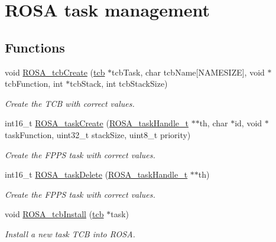 \hypertarget{group__rosa__kernel__module}{}\section{R\+O\+SA task management}
\label{group__rosa__kernel__module}
\subsection*{Functions}
\begin{DoxyCompactItemize}
\item 
void \mbox{\hyperlink{group__rosa__kernel__module_ga88a553c195e2f549835cbbf4e36a71ff}{R\+O\+S\+A\+\_\+tcb\+Create}} (\mbox{\hyperlink{structtcb__record__t}{tcb}} $\ast$tcb\+Task, char tcb\+Name\mbox{[}N\+A\+M\+E\+S\+I\+ZE\mbox{]}, void $\ast$tcb\+Function, int $\ast$tcb\+Stack, int tcb\+Stack\+Size)
\begin{DoxyCompactList}\small\item\em Create the T\+CB with correct values. \end{DoxyCompactList}\item 
int16\+\_\+t \mbox{\hyperlink{group__rosa__kernel__module_ga7b9542dcdbdadbfc94f42f85536a83b0}{R\+O\+S\+A\+\_\+task\+Create}} (\mbox{\hyperlink{structtcb__record__t}{R\+O\+S\+A\+\_\+task\+Handle\+\_\+t}} $\ast$$\ast$th, char $\ast$id, void $\ast$task\+Function, uint32\+\_\+t stack\+Size, uint8\+\_\+t priority)
\begin{DoxyCompactList}\small\item\em Create the F\+P\+PS task with correct values. \end{DoxyCompactList}\item 
int16\+\_\+t \mbox{\hyperlink{group__rosa__kernel__module_gad0845723ed20c9e51a81a7b388dbc555}{R\+O\+S\+A\+\_\+task\+Delete}} (\mbox{\hyperlink{structtcb__record__t}{R\+O\+S\+A\+\_\+task\+Handle\+\_\+t}} $\ast$$\ast$th)
\begin{DoxyCompactList}\small\item\em Create the F\+P\+PS task with correct values. \end{DoxyCompactList}\item 
void \mbox{\hyperlink{group__rosa__kernel__module_ga9a7bde19bc8609de66353d1f51d09eda}{R\+O\+S\+A\+\_\+tcb\+Install}} (\mbox{\hyperlink{structtcb__record__t}{tcb}} $\ast$task)
\begin{DoxyCompactList}\small\item\em Install a new task T\+CB into R\+O\+SA. \end{DoxyCompactList}\end{DoxyCompactItemize}
